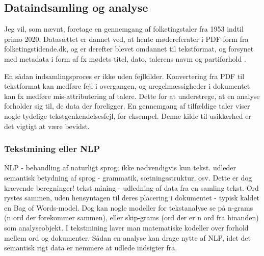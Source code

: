 \subsection{Dataindsamling og analyse}\label{sec:data}

Jeg vil, som nævnt, foretage en gennemgang af folketingstaler fra 1953 indtil primo 2020.
Datasættet er dannet ved, at hente mødereferater i PDF-form fra folketingstidende.dk, og er derefter blevet omdannet til tekstformat, og forsynet med metadata i form af fx mødets titel, dato, talerens navm og partiforhold  \autocite{pedersenFolketinget2019}.

En sådan indsamlingsproces er ikke uden fejlkilder. Konvertering fra PDF til tekstformat kan medføre fejl i overgangen, og uregelmæssigheder i dokumentet kan fx medføre mis-attributering af talere.
Dette for at understrege, at en analyse forholder sig til, de data der foreligger.
En gennemgang af tilfældige taler viser nogle tydelige tekstgenkendelsesfejl, for eksempel.
Denne kilde til usikkerhed er det vigtigt at være bevidst.

\subsubsection{Tekstmining eller NLP}

NLP - behandling af naturligt sprog;  ikke nødvendigvis kun tekst. udleder semantisk betydning af sprog - grammatik, sœtningsstruktur, osv. Dette er dog krævende beregninger!
tekst mining - udledning af data fra en samling tekst. Ord rystes sammen, uden hensyntagen til deres placering i dokumentet - typisk kaldet en Bag of Words-model. Dog kan nogle modeller for tekstanalyse se på n-grams (n ord der forekommer sammen), eller skip-grams (ord der er n ord fra hinanden) som analyseobjekt. 
I tekstmining laver man matematiske kodeller over forhold mellem ord og dokumenter.
Sådan en analyse kan drage nytte af NLP, idet det semantisk rigt data er nemmere at udlede indsigter fra.

